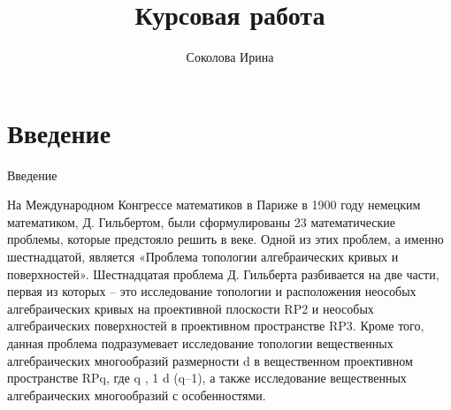 \documentclass[12pt]{book}
\title{Курсовая работа}
\author{Соколова Ирина}
\newcommand{\RomanNumeralCaps}[1]
    {\MakeUppercase{\romannumeral #1}}
\numberwithin{exercise}{chapter}
\begin{document}
\pagestyle{plain}
\makeatletter

\section{Введение}

Введение

        На \RomanNumeralCaps{2} Международном Конгрессе математиков в Париже в 1900 году немецким математиком, Д. Гильбертом, были сформулированы 23 математические проблемы, которые предстояло решить в \RomanNumeralCaps{20} веке. Одной из этих проблем, а именно шестнадцатой, является «Проблема топологии алгебраических кривых и поверхностей». Шестнадцатая проблема Д. Гильберта разбивается на две части, первая из которых – это исследование топологии и расположения неособых алгебраических кривых на проективной плоскости RP2 и неособых алгебраических поверхностей в проективном пространстве RP3. Кроме того, данная проблема подразумевает исследование топологии вещественных алгебраических многообразий размерности d в вещественном проективном пространстве RPq, где q , 1 \leqslant d \leqslant (q–1), а также исследование вещественных алгебраических многообразий с особенностями. 

\makeatother
\end{document}
